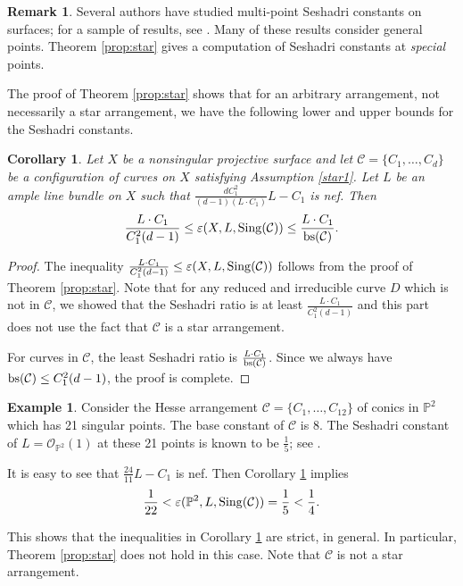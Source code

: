 \documentclass[12pt,reqno]{amsart}
\theoremstyle{plain}
\numberwithin{equation}{section}
\newtheorem{corollary}[theorem]{Corollary}
\theoremstyle{definition}
\newtheorem{remark}[theorem]{Remark}
\newtheorem{example}[theorem]{Example}
\begin{document}
\begin{remark}
Several authors have studied multi-point Seshadri constants on surfaces; for a sample of results, see \cite{B,HM, HR, PR, RR, SS}. 
Many of these results consider general points. 
Theorem \ref{prop:star} gives a computation of Seshadri constants at \textit{special} points. 
\end{remark}


The proof of Theorem \ref{prop:star} shows that for an arbitrary arrangement, not necessarily a star arrangement, we have the following lower and upper bounds for the Seshadri constants. 


\begin{corollary}\label{cor-main}
Let $X$ be a nonsingular projective surface and let $\mathcal{C} = \{C_{1}, \ldots, C_{d}\}$ be a configuration of curves on $X$ satisfying Assumption \ref{star1}.
 Let $L$ be an ample line bundle on $X$
		such that  $\frac{dC_1^2}{(d-1)(L\cdot C_1)}L-C_1$ is nef.   Then
$$\frac{L\cdot C_1}{C_1^2(d-1)} \le \varepsilon(X, L,{\rm Sing}(\mathcal{C})) \le \frac{L \cdot C_1}{{\rm bs} (\mathcal{C})}  .$$
\end{corollary} 
\begin{proof}
The inequality $\frac{L\cdot C_1}{C_1^2(d-1)} \le \varepsilon(X, L,{\rm Sing}(\mathcal{C}))$ follows from the proof of Theorem \ref{prop:star}. Note that for any reduced and irreducible curve $D$ which is not in $\mathcal{C}$, we showed that the Seshadri ratio is at least $\frac{L\cdot C_1}{C_1^2(d-1)}$ and this part does not use the fact that $\mathcal{C}$ is a star arrangement. 

For curves in $\mathcal{C}$, the least Seshadri ratio is  $\frac{L \cdot C_1}{\rm{bs} (\mathcal{C})}$. 
Since we always have ${\rm bs} (\mathcal{C}) \le C_1^2(d-1)$, the proof is complete. 
\end{proof}





\begin{example}
Consider the Hesse arrangement $\mathcal{C} = \{C_1, \ldots, C_{12}\}$  of conics in $\mathbb{P}^2$
which has 21 singular points.  The base constant of $\mathcal{C}$  is 8.  
 The Seshadri constant of $L = \mathcal{O}_{\mathbb{P}^2}(1)$ at these 21 points is known to be $\frac{1}{5}$; see \cite[Example 3.5]{JP}. 


It is easy to see that $\frac{24}{11}L - C_1$ is nef. 
Then Corollary \ref{cor-main} implies
$$\frac{1}{22} <  \varepsilon(\mathbb{P}^2, L,{\rm Sing}(\mathcal{C})) = \frac{1}{5}<  \frac{1}{4}.$$

This shows that the inequalities in Corollary \ref{cor-main} are strict, in general. In particular,  Theorem \ref{prop:star} does not hold in this case. Note that $\mathcal{C}$ is not a star arrangement.   


\end{example}
\end{document}
